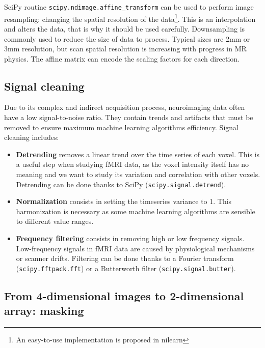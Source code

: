 \documentclass{frontiersSCNS} %
\begin{document}
SciPy routine \texttt{scipy.ndimage.affine\_transform}
can be used to perform image resampling: 
changing the spatial resolution of the data\footnote{An easy-to-use
implementation is proposed in nilearn}. This is
an interpolation and alters the data, that is why it should be used carefully.
Downsampling is commonly used to reduce the size of data to process.
Typical sizes are 2mm or 3mm resolution, but scan spatial resolution is
increasing with progress in MR physics. The affine matrix can encode the
scaling factors for each direction.

\subsection{Signal cleaning}

Due to its complex and indirect acquisition process, neuroimaging data often
have a low
signal-to-noise ratio. They contain trends and artifacts that must be removed
to ensure maximum machine learning algorithms efficiency. Signal cleaning
includes:
\begin{itemize}
    \item{\bf Detrending} removes a linear trend over the time series of each
        voxel. This is a useful step when studying fMRI data, as the voxel
        intensity itself has no meaning and we want to study its variation and
        correlation with other voxels. Detrending can be done thanks to SciPy
        (\texttt{scipy.signal.detrend}).
    \item{\bf Normalization} consists in setting the timeseries variance to 1.
        This harmonization is necessary as some machine learning algorithms are
        sensible to different value ranges.
    \item{\bf Frequency filtering} consists in removing high or low
        frequency signals. Low-frequency signals in fMRI data are caused by
        physiological mechanisms or scanner drifts. Filtering can be done thanks
        to a Fourier transform (\texttt{scipy.fftpack.fft}) or a Butterworth
        filter (\texttt{scipy.signal.butter}).
\end{itemize}

\subsection{From 4-dimensional images to 2-dimensional array: masking}

\label{sec:unmasking}
\end{document}
